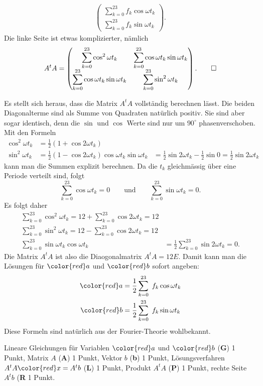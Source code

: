 \begin{loesung}
\begin{align*}
\begin{pmatrix}
\displaystyle\sum_{k=0}^{23} f_k\cos\omega t_k\\
\displaystyle\sum_{k=0}^{23} f_k\sin\omega t_k
\end{pmatrix}.
\end{align*}
Die linke Seite ist etwas komplizierter, nämlich
\[
A^tA
=
\begin{pmatrix}
\displaystyle \sum_{k=0}^{23} \cos^2\omega t_k
&
\displaystyle \sum_{k=0}^{23} \cos\omega t_k\sin\omega t_k
\\
\displaystyle \sum_{k=0}^{23} \cos\omega t_k\sin\omega t_k
&
\displaystyle \sum_{k=0}^{23} \sin^2\omega t_k
\end{pmatrix}.
\qedhere
\]
\end{loesung}

\begin{diskussion}
Es stellt sich heraus, dass die Matrix $A^tA$ vollständig berechnen lässt.
Die beiden Diagonalterme sind als Summe von Quadraten natürlich positiv.
Sie sind aber sogar identisch, denn die $\sin$ und $\cos$ Werte
sind nur um $90^\circ$ phasenverschoben.
Mit den Formeln
\begin{align*}
\cos^2\omega t_k
&=
\frac12(1+\cos2\omega t_k)
\\
\sin^2\omega t_k
&=
\frac12(1-\cos 2\omega t_k)
\cos\omega t_k \sin\omega t_k
&=
\frac12\sin2\omega t_k
-
\frac12\sin 0
=
\frac12\sin2\omega t_k
\end{align*}
kann man die Summen explizit berechnen.
Da die $t_k$ gleichmässig über eine Periode verteilt sind, folgt
\[
\sum_{k=0}^23 \cos\omega t_k = 0
\qquad\text{und}\qquad
\sum_{k=0}^23 \sin\omega t_k = 0.
\]
Es folgt daher
\begin{align*}
\sum_{k=0}^{23}
\cos^2\omega t_k
=
12 + \sum_{k=0}^{23}\cos2\omega t_k = 12
\\
\sum_{k=0}^{23}
\sin^2\omega t_k
=
12 - \sum_{k=0}^{23}\cos2\omega t_k = 12
\\
\sum_{k=0}^{23}
\sin\omega t_k\cos\omega t_k
&=
\frac12\sum_{k=0}^{23} \sin 2\omega t_k
= 0.
\end{align*}
Die Matrix $A^tA$ ist also die Diaogonalmatrix $A^tA=12E$.
Damit kann man die Lösungen für ${\color{red}a}$ und ${\color{red}b}$
sofort angeben:
\begin{align*}
{\color{red}a}
&= 
\frac12\sum_{k=0}^{23} f_k \cos\omega t_k
\\
{\color{red}b}
&= 
\frac12\sum_{k=0}^{23} f_k \sin\omega t_k
\end{align*}
Diese Formeln sind natürlich aus der Fourier-Theorie wohlbekannt.
\end{diskussion}

\begin{bewertung}
Lineare Gleichungen für Variablen ${\color{red}a}$ und ${\color{red}b}$
({\bf G}) 1 Punkt,
Matrix $A$ ({\bf A}) 1 Punkt,
Vektor $b$ ({\bf b}) 1 Punkt,
Lösungsverfahren $A^tA{\color{red}x} = A^tb$ ({\bf L}) 1 Punkt,
Produkt $A^tA$ ({\bf P}) 1 Punkt,
rechte Seite $A^tb$ ({\bf R} 1 Punkt.
\end{bewertung}




